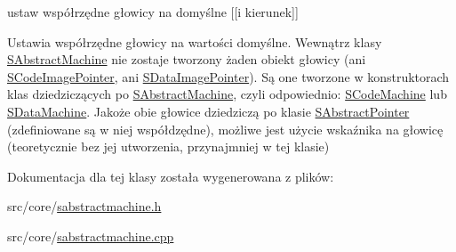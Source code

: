 ustaw współrzędne głowicy na domyślne \mbox{[}\mbox{[}i kierunek\mbox{]}\mbox{]} 

Ustawia współrzędne głowicy na wartości domyślne. Wewnątrz klasy \hyperlink{classSAbstractMachine}{SAbstractMachine} nie zostaje tworzony żaden obiekt głowicy (ani \hyperlink{classSCodeImagePointer}{SCodeImagePointer}, ani \hyperlink{classSDataImagePointer}{SDataImagePointer}). Są one tworzone w konstruktorach klas dziedziczących po \hyperlink{classSAbstractMachine}{SAbstractMachine}, czyli odpowiednio: \hyperlink{classSCodeMachine}{SCodeMachine} lub \hyperlink{classSDataMachine}{SDataMachine}. Jakoże obie głowice dziedziczą po klasie \hyperlink{classSAbstractPointer}{SAbstractPointer} (zdefiniowane są w niej współdzędne), możliwe jest użycie wskaźnika na głowicę (teoretycznie bez jej utworzenia, przynajmniej w tej klasie) 

Dokumentacja dla tej klasy została wygenerowana z plików:\begin{CompactItemize}
\item 
src/core/\hyperlink{sabstractmachine_8h}{sabstractmachine.h}\item 
src/core/\hyperlink{sabstractmachine_8cpp}{sabstractmachine.cpp}\end{CompactItemize}
